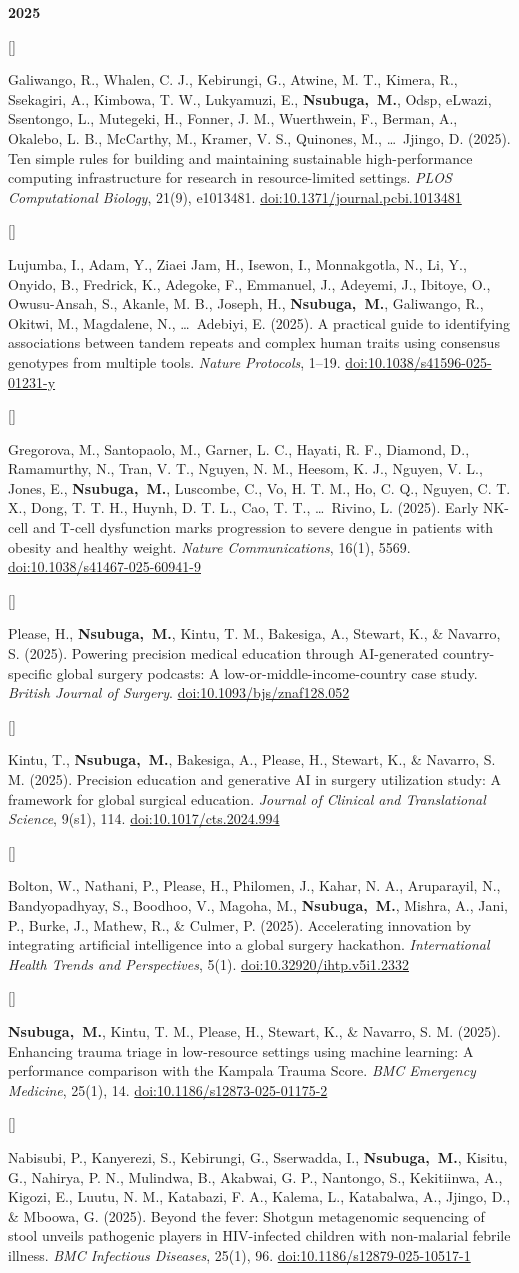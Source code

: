 \documentclass[10pt]{article}
\newlength{\pubcol}\setlength{\pubcol}{0.9cm}     %
\newlength{\subheadgap}\setlength{\subheadgap}{4pt}   %
\newlength{\entrygap}\setlength{\entrygap}{10pt}       %
\newcommand{\subhead}[1]{\par\addvspace{\entrygap}%
  {\headfont\small\bfseries\color{muted}#1}\par\nopagebreak\addvspace{\subheadgap}}
\newcounter{pubno}
\newcommand{\me}{\textbf{Nsubuga,~M.}}
\newcommand{\pub}[1]{\stepcounter{pubno}%
  \par\addvspace{\entrygap}%
  \noindent\parbox[t]{\pubcol}{\raggedright\leavevmode\headfont\small\color{muted}[\thepubno]}%
  \parbox[t]{\dimexpr\linewidth-\pubcol\relax}{\raggedright #1}\par\addvspace{\entrygap}}
\newcommand{\doi}[1]{\href{https://doi.org/#1}{doi:#1}}
\begin{document}
\subhead{2025}
\pub{Galiwango, R., Whalen, C. J., Kebirungi, G., Atwine, M. T., Kimera, R., Ssekagiri, A., Kimbowa, T. W., Lukyamuzi, E., \me, Odsp, eLwazi, Ssentongo, L., Mutegeki, H., Fonner, J. M., Wuerthwein, F., Berman, A., Okalebo, L. B., McCarthy, M., Kramer, V. S., Quinones, M., \ldots\ Jjingo, D. (2025). Ten simple rules for building and maintaining sustainable high-performance computing infrastructure for research in resource-limited settings. \textit{PLOS Computational Biology}, 21(9), e1013481. \doi{10.1371/journal.pcbi.1013481}}
\pub{Lujumba, I., Adam, Y., Ziaei Jam, H., Isewon, I., Monnakgotla, N., Li, Y., Onyido, B., Fredrick, K., Adegoke, F., Emmanuel, J., Adeyemi, J., Ibitoye, O., Owusu-Ansah, S., Akanle, M. B., Joseph, H., \me, Galiwango, R., Okitwi, M., Magdalene, N., \ldots\ Adebiyi, E. (2025). A practical guide to identifying associations between tandem repeats and complex human traits using consensus genotypes from multiple tools. \textit{Nature Protocols}, 1--19. \doi{10.1038/s41596-025-01231-y}}
\pub{Gregorova, M., Santopaolo, M., Garner, L. C., Hayati, R. F., Diamond, D., Ramamurthy, N., Tran, V. T., Nguyen, N. M., Heesom, K. J., Nguyen, V. L., Jones, E., \me, Luscombe, C., Vo, H. T. M., Ho, C. Q., Nguyen, C. T. X., Dong, T. T. H., Huynh, D. T. L., Cao, T. T., \ldots\ Rivino, L. (2025). Early NK-cell and T-cell dysfunction marks progression to severe dengue in patients with obesity and healthy weight. \textit{Nature Communications}, 16(1), 5569. \doi{10.1038/s41467-025-60941-9}}
\pub{Please, H., \me, Kintu, T. M., Bakesiga, A., Stewart, K., \& Navarro, S. (2025). Powering precision medical education through AI-generated country-specific global surgery podcasts: A low-or-middle-income-country case study. \textit{British Journal of Surgery}. \doi{10.1093/bjs/znaf128.052}}
\pub{Kintu, T., \me, Bakesiga, A., Please, H., Stewart, K., \& Navarro, S. M. (2025). Precision education and generative AI in surgery utilization study: A framework for global surgical education. \textit{Journal of Clinical and Translational Science}, 9(s1), 114. \doi{10.1017/cts.2024.994}}
\pub{Bolton, W., Nathani, P., Please, H., Philomen, J., Kahar, N. A., Aruparayil, N., Bandyopadhyay, S., Boodhoo, V., Magoha, M., \me, Mishra, A., Jani, P., Burke, J., Mathew, R., \& Culmer, P. (2025). Accelerating innovation by integrating artificial intelligence into a global surgery hackathon. \textit{International Health Trends and Perspectives}, 5(1). \doi{10.32920/ihtp.v5i1.2332}}
\pub{\me, Kintu, T. M., Please, H., Stewart, K., \& Navarro, S. M. (2025). Enhancing trauma triage in low-resource settings using machine learning: A performance comparison with the Kampala Trauma Score. \textit{BMC Emergency Medicine}, 25(1), 14. \doi{10.1186/s12873-025-01175-2}}
\pub{Nabisubi, P., Kanyerezi, S., Kebirungi, G., Sserwadda, I., \me, Kisitu, G., Nahirya, P. N., Mulindwa, B., Akabwai, G. P., Nantongo, S., Kekitiinwa, A., Kigozi, E., Luutu, N. M., Katabazi, F. A., Kalema, L., Katabalwa, A., Jjingo, D., \& Mboowa, G. (2025). Beyond the fever: Shotgun metagenomic sequencing of stool unveils pathogenic players in HIV-infected children with non-malarial febrile illness. \textit{BMC Infectious Diseases}, 25(1), 96. \doi{10.1186/s12879-025-10517-1}}
\end{document}

